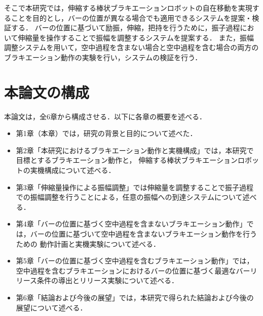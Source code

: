           そこで本研究では，伸縮する棒状ブラキエーションロボットの自在移動を実現することを目的とし，バーの位置が異なる場合でも適用できるシステムを提案・検証する．
          バーの位置に基づいて励振，伸縮，把持を行うために，振子過程において伸縮量を操作することで振幅を調整するシステムを提案する．
          また，振幅調整システムを用いて，空中過程を含まない場合と空中過程を含む場合の両方のブラキエーション動作の実験を行い，システムの検証を行う．
          
        \section{本論文の構成}

          本論文は，全6章から構成させる．以下に各章の概要を述べる．
          \begin{itemize}
            \item 第1章（本章）では，研究の背景と目的について述べた．
            \item 第2章「本研究におけるブラキエーション動作と実機構成」では，本研究で目標とするブラキエーション動作と，
            伸縮する棒状ブラキエーションロボットの実機構成について述べる．
            \item 第3章「伸縮量操作による振幅調整」では伸縮量を調整することで振子過程での振幅調整を行うことによる，任意の振幅への到達システムについて述べる．
            \item 第4章「バーの位置に基づく空中過程を含まないブラキエーション動作」では，バーの位置に基づいて空中過程を含まないブラキエーション動作を行うための
            動作計画と実機実験について述べる．
            \item 第5章「バーの位置に基づく空中過程を含むブラキエーション動作」では，空中過程を含むブラキエーションにおけるバーの位置に基づく最適なバーリリース条件の導出とリリース実験について述べる．         
            \item 第6章「結論および今後の展望」では，本研究で得られた結論および今後の展望について述べる．
          \end{itemize}

          

